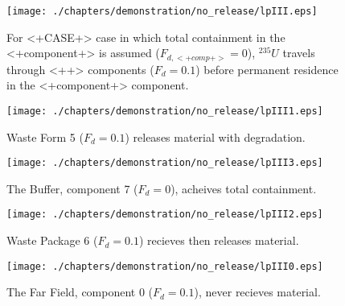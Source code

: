 \begin{figure}[ht]
\centering
\texttt{[image: ./chapters/demonstration/no\_release/lpIII.eps]}
\caption[$^{235}U$ residence. Lumped Parameter  <+Component+> No Release.]{
For <+CASE+> case in which total containment in the <+component+> is assumed 
($F_{d,<+comp+>}=0$), $^{235}U$ travels through <++> components ($F_d = 0.1$) before 
permanent residence in the <+component+> component.
}
\label{fig:lpIIIall}
\begin{minipage}[b]{0.45\linewidth}

  \texttt{[image: ./chapters/demonstration/no\_release/lpIII1.eps]}
  \caption[1DIII Waste Form Contaminants.]{
    Waste Form 5 ($F_d = 0.1$) releases material with degradation. 
    }
  \label{fig:lpIIIwf5}
  
  \texttt{[image: ./chapters/demonstration/no\_release/lpIII3.eps]}
  \caption[Case 1DIII Buffer Contaminants]{
    The Buffer, component 7 ($F_d=0$), acheives total containment.
    }
  \label{fig:lpIIIbuff}

\end{minipage}
\hspace{0.05\linewidth}
\begin{minipage}[b]{0.45\linewidth}
  \texttt{[image: ./chapters/demonstration/no\_release/lpIII2.eps]}
  \caption[Case 1DIII Waste Package Contaminants.]{ 
    Waste Package 6 ($F_d = 0.1$) recieves then releases material. 
    }
  \label{fig:lpIIIwp6}

  \texttt{[image: ./chapters/demonstration/no\_release/lpIII0.eps]}
  \caption[Case 1DIII Waste Package Contaminants.]{ 
    The Far Field, component 0 ($F_d = 0.1$), never recieves material.
    }
  \label{fig:lpIIIff0}


  \end{minipage}
\end{figure}


